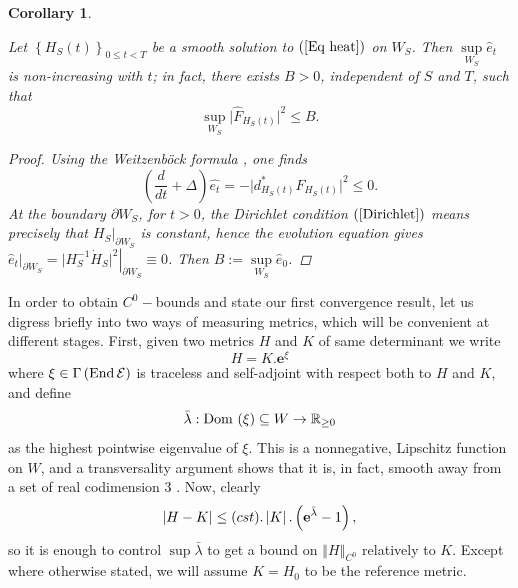 \documentclass{article}
\newcommand{\func}[1]{\textnormal {#1\,}}
\newcommand{\e}[1]{\mathbf{e}^{#1}}
\newtheorem{corollary}[theorem]{Corollary}
\begin{document}
\begin{corollary}       \label{Cor Bounded F hat}

Let $\left\{ H_{S}\left( t\right) \right\} _{0\leq t<T}$ be a smooth solution to $\left( \ref{Eq heat}\right)$ on $W_{S}$. Then $\sup\limits_{W_{S}}\hat{e}_{t}$ is non-increasing with $t$; in fact, there exists $B>0$, independent of $S$ and $T$, such that%
\begin{equation}        \label{Eq bound on F hat}
        \sup_{W_{S}}\vert\hat{F}_{H_{S}(t)}\vert^{2}\leq B.
\end{equation}
\begin{proof}
Using the Weitzenb\"{o}ck formula \cite[p. 221]{4-manifolds}, one finds%
\begin{equation}       \label{eq (d/dt+D)e^ < 0}
        \left( \frac{d}{dt}+\Delta \right) \hat{e_{t}}
        =-\vert d_{H_{S}\left(t\right) }^{\ast }F_{H_{S}
        \left( t\right) }\vert ^{2}\leq 0.
\end{equation}%
At the boundary $\partial W_{S}$, for $t>0$, the Dirichlet condition $\left( \ref{Dirichlet}\right) $ means precisely that $\left. H_{S}\right\vert
_{\partial W_{S}}$ is constant, hence the evolution equation gives $\left. \hat{e}_{t}\right\vert _{\partial W_{S}}=\left. \vert H_{S}^{-1}\dot{H}%
_{S}\vert ^{2}\right\vert _{\partial W_{S}}\equiv 0$. Then $%
B:=\sup\limits_{W_{S}}\hat{e}_{0}$.
\end{proof}
\end{corollary}

In order to obtain $C^{0}-$bounds and state our first convergence result,
let us digress briefly into two ways of measuring metrics, which will be
convenient at different stages. First, given two
metrics $H$ and $K$ of same determinant we write%
\begin{equation*}
H=K.\e{\xi }
\end{equation*}%
where $\xi \in \Gamma \left( \func{End}\mathcal{E}\right) $ is traceless
and self-adjoint with respect both to $H$ and $K$, and define 
\begin{equation}          \label{eq def lambda bar}
        \bar{\lambda}:\func{Dom}\left( \xi \right) 
        \subseteq W\rightarrow \mathbb{R}_{\geq 0}
\end{equation}%
as the highest pointwise eigenvalue of $\xi $.
 This is a nonnegative, Lipschitz function on $W$, and a transversality argument shows that it is, in fact, smooth away from a set of real codimension 3 \cite[pp.240, 244]{inf dets stab bdls...}. Now, clearly
\begin{equation}        \index{distance}
                        \label{Eq C0 norm and lambda bar}
        \left\vert H-K\right\vert \leq (cst).\left\vert K\right\vert 
        .\left( \e{\bar{\lambda}}-1\right) ,
\end{equation}%
so it is enough to control $\sup \bar{\lambda}$ to get a bound on $%
\left\Vert H\right\Vert _{C^{0}}$ relatively to $K$. Except where otherwise
stated, we will assume $K=H_{0}$ to be the reference metric.
\end{document}
